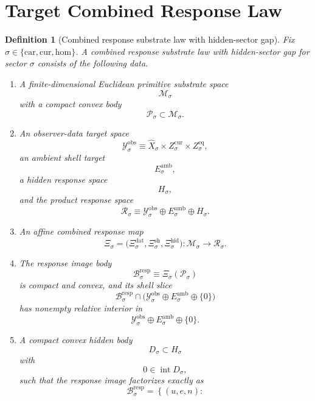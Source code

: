 \documentclass[11pt]{article}
\newcommand{\Car}{\mathrm{car}}
\newcommand{\Cur}{\mathrm{cur}}
\newcommand{\Hom}{\mathrm{hom}}
\newcommand{\VisibleAffine}[1]{\widehat X_{#1}}
\newcommand{\DataSpace}[1]{\mathcal Y_{#1}^{\mathrm{obs}}}
\newcommand{\AmbientTarget}[1]{E_{#1}^{\mathrm{amb}}}
\newcommand{\ProtoSpace}[1]{\mathcal M_{#1}}
\newcommand{\ProtoBody}[1]{\mathcal P_{#1}}
\newcommand{\ResponseSpace}[1]{\mathcal R_{#1}}
\newcommand{\ResponseMap}[1]{\Xi_{#1}}
\newcommand{\ResponseData}[1]{\Xi_{#1}^{\mathrm{dat}}}
\newcommand{\ResponseShell}[1]{\Xi_{#1}^{\mathrm{sh}}}
\newcommand{\ResponseHidden}[1]{\Xi_{#1}^{\mathrm{hid}}}
\newcommand{\ResponseImage}[1]{\mathcal B_{#1}^{\mathrm{resp}}}
\newcommand{\GapSpace}[1]{H_{#1}}
\newcommand{\GapBody}[1]{D_{#1}}
\newtheorem{definition}{Definition}
\begin{document}
\section{Target Combined Response Law}

\begin{definition}[Combined response substrate law with hidden-sector gap]
\label{def:combined}
Fix \(\sigma\in\{\Car,\Cur,\Hom\}\). A \emph{combined response substrate law with hidden-sector gap} for sector \(\sigma\) consists of the following data.
\begin{enumerate}
    \item A finite-dimensional Euclidean primitive substrate space
    \[
    \ProtoSpace{\sigma}
    \]
    with a compact convex body
    \[
    \ProtoBody{\sigma}\subset \ProtoSpace{\sigma}.
    \]
    \item An observer-data target space
    \[
    \DataSpace{\sigma}
    \equiv
    \VisibleAffine{\sigma}\times Z_{\sigma}^{\mathrm{cur}}\times Z_{\sigma}^{\mathrm{eq}},
    \]
    an ambient shell target
    \[
    \AmbientTarget{\sigma},
    \]
    a hidden response space
    \[
    \GapSpace{\sigma},
    \]
    and the product response space
    \[
    \ResponseSpace{\sigma}
    \equiv
    \DataSpace{\sigma}\oplus \AmbientTarget{\sigma}\oplus \GapSpace{\sigma}.
    \]
    \item An affine combined response map
    \[
    \ResponseMap{\sigma}
    =
    \bigl(
    \ResponseData{\sigma},
    \ResponseShell{\sigma},
    \ResponseHidden{\sigma}
    \bigr):
    \ProtoSpace{\sigma}\to \ResponseSpace{\sigma}.
    \]
    \item The response image body
    \begin{equation}
    \ResponseImage{\sigma}
    \equiv
    \ResponseMap{\sigma}(\ProtoBody{\sigma})
    \label{eq:imagebody}
    \end{equation}
    is compact and convex, and its shell slice
    \[
    \ResponseImage{\sigma}\cap
    \bigl(
    \DataSpace{\sigma}\oplus \AmbientTarget{\sigma}\oplus\{0\}
    \bigr)
    \]
    has nonempty relative interior in
    \[
    \DataSpace{\sigma}\oplus \AmbientTarget{\sigma}\oplus\{0\}.
    \]
    \item A compact convex hidden body
    \[
    \GapBody{\sigma}\subset \GapSpace{\sigma}
    \]
    with
    \[
    0\in\operatorname{int}\GapBody{\sigma},
    \]
    such that the response image factorizes exactly as
    \begin{equation}
    \ResponseImage{\sigma}
    =
    \left\{
    (u,e,n):

\end{equation}
\end{enumerate}
\end{definition}
\end{document}
